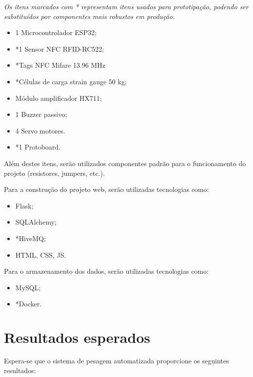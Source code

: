 \documentclass[11pt]{article}
\begin{document}
\textit{Os itens marcados com * representam itens usados para prototipação, podendo ser substituídos por componentes mais robustos em produção.}

\begin{itemize}
    \item 1 Microcontrolador ESP32;
    \item *1 Sensor NFC RFID-RC522;
    \item *Tags NFC Mifare 13.96 MHz
    \item *Células de carga strain gauge 50 kg;
    \item Módulo amplificador HX711;
    \item 1 Buzzer passivo;
    \item 4 Servo motores.
    \item *1 Protoboard.
\end{itemize}

Além destes itens, serão utilizados componentes padrão para o funcionamento do projeto (resistores, jumpers, etc.).

Para a construção do projeto web, serão utilizadas tecnologias como:
\begin{itemize}
    \item Flask;
    \item SQLAlchemy;
    \item *HiveMQ;
    \item HTML, CSS, JS.
\end{itemize}

Para o armazenamento dos dados, serão utilizadas tecnologias como:
\begin{itemize}
    \item MySQL;
    \item *Docker.
\end{itemize}


\section{Resultados esperados}
Espera-se que o sistema de pesagem automatizada proporcione os seguintes resultados:
\end{document}
